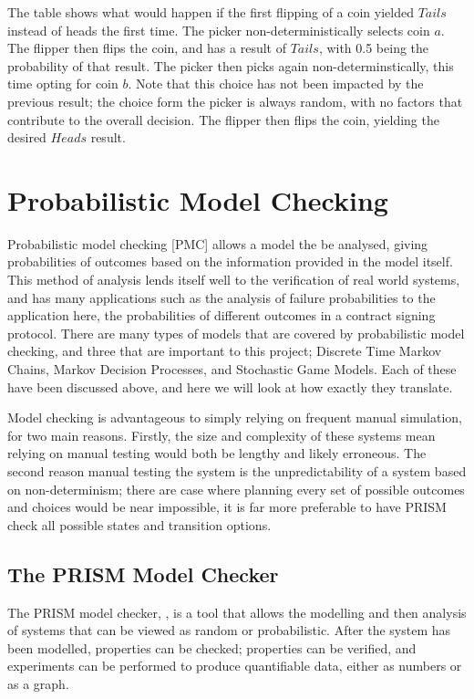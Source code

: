 \documentclass{l4proj}
\begin{document}
The table shows what would happen if the first flipping of a coin yielded $Tails$ instead of heads the first time. The picker non-deterministically selects coin $a$. The flipper then flips the coin, and has a result of $Tails$, with 0.5 being the probability of that result. The picker then picks again non-determinstically, this time opting for coin $b$. Note that this choice has not been impacted by the previous result; the choice form the picker is always random, with no factors that contribute to the overall decision. The flipper then flips the coin, yielding the desired $Heads$ result.



\section{Probabilistic Model Checking}


Probabilistic model checking [PMC] allows a model the be analysed, giving probabilities of outcomes based on the information provided in the model itself. This method of analysis lends itself well to the verification of real world systems, and has many applications such as the analysis of failure probabilities to the application here, the probabilities of different outcomes in a contract signing protocol. There are many types of models that are covered by probabilistic model checking, and three that are important to this project; Discrete Time Markov Chains, Markov Decision Processes, and Stochastic Game Models. Each of these have been discussed above, and here we will look at how exactly they translate.

 Model checking is advantageous to simply relying on frequent manual simulation, for two main reasons. Firstly, the size and complexity of these systems mean relying on manual testing would both be lengthy and likely erroneous. The second reason manual testing the system is the unpredictability of a system based on non-determinism; there are case where planning every set of possible outcomes and choices would be near impossible, it is far more preferable to have PRISM check all possible states and transition options.

\subsection{The PRISM Model Checker}

The PRISM model checker, \cite{Pri}, is a tool that allows the modelling and then analysis of systems that can be viewed as random or probabilistic. After the system has been modelled, properties can be checked; properties can be verified, and experiments can be performed to produce quantifiable data, either as numbers or as a graph. 
\end{document}
